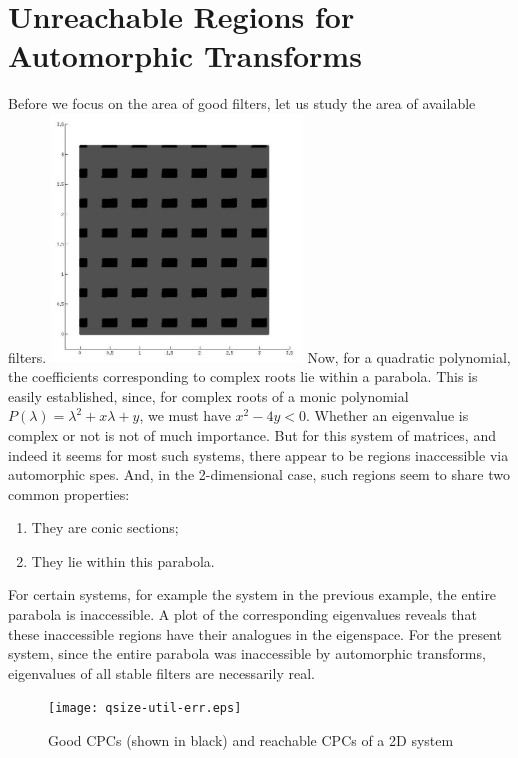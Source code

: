 \section{Unreachable Regions for Automorphic Transforms}
\begin{multicols}{2}
\label{sec:un}
Before we focus on the area of good filters, let us study the area of 
available filters.
\includegraphics[width=0.5\textwidth]{theta_s_in_uns.jpg}
Now, for a quadratic polynomial, the coefficients corresponding to
complex roots lie within a parabola. This is easily established, 
since, for complex roots of a monic polynomial 
$P(\lambda) = \lambda^2 + x\lambda + y$, we must have
$x^2 - 4y < 0$. Whether an eigenvalue is complex or not is not of
much importance. But for this system of matrices, and indeed it seems for
most such systems, there appear to be regions inaccessible via 
automorphic \glspl{spe}. And, in the 2-dimensional case, such 
regions seem to share two common properties: 
\begin{enumerate}
\item They are conic sections;
\item They lie within this parabola.
\end{enumerate}
For certain systems, for example the system in the previous example,
the entire parabola is inaccessible. A plot of the corresponding
eigenvalues reveals that these inaccessible regions have their 
analogues in the eigenspace. For the present system, since the entire
parabola was inaccessible by automorphic transforms, eigenvalues of all
stable filters are necessarily real.
\begin{figure}
\centering
\texttt{[image: qsize-util-err.eps]}
\caption{Good CPCs (shown in black) and reachable CPCs of a 2D system}
\label{fig:s_vs_us}
\end{figure}


\end{multicols}
